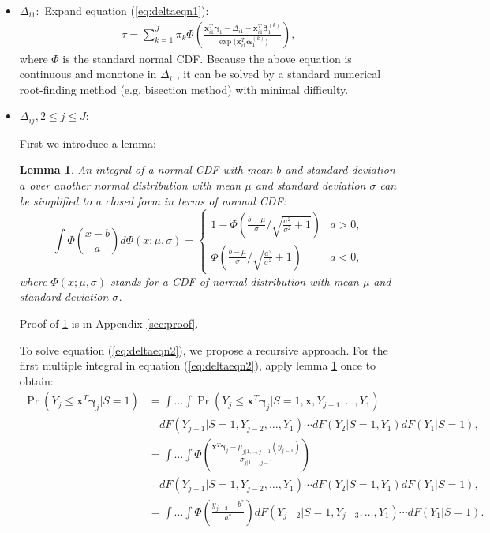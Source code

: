 \documentclass[12pt]{article}
\newtheorem{lem}[thm]{Lemma}
\DeclareMathOperator{\prob}{Pr}
\begin{document}
\begin{itemize}
\item \textbf{$\Delta_{i1}: $} Expand equation (\ref{eq:deltaeqn1}):
  \begin{align*}
    \tau = \sum_{k = 1}^J \pi_k \Phi \left( \frac{\bm x_{i1}^T \bm
        \gamma_1 - \Delta_{i1} - \bm x_{i1}^T\bm \beta_1^{(k)}}{\exp
        \big( \bm x_{i1}^T \bm \alpha_1^{(k)} \big)} \right),
  \end{align*}
  where $\Phi$ is the standard normal CDF. Because the above equation
  is continuous and monotone in $\Delta_{i1}$, it can be solved by a
  standard numerical root-finding method (e.g. bisection method) with
  minimal difficulty.

\item \textbf{$\Delta_{ij}, 2\leq j \leq J: $}

  First we introduce a lemma:
  \begin{lem}\label{sec:lemma}
    An integral of a normal CDF with mean $b$ and standard deviation
    $a$ over another normal distribution with mean $\mu$ and standard
    deviation $\sigma$ can be simplified to a closed form in terms of
    normal CDF:
    \begin{equation}
      \label{eq:lem}
      \int \Phi \left( \frac{x-b}{a} \right) d\Phi(x; \mu, \sigma)  =
      \begin{cases}
        1- \Phi \left( \frac{b-\mu}{\sigma} \big / \sqrt{\frac{a^2}{\sigma^2}+1} \right) & a > 0, \\
        \Phi \left( \frac{b-\mu}{\sigma} \big /
          \sqrt{\frac{a^2}{\sigma^2}+1} \right) & a < 0,
      \end{cases}
    \end{equation}
    where $\Phi(x; \mu, \sigma)$ stands for a CDF of normal
    distribution with mean $\mu$ and standard deviation $\sigma$.
  \end{lem}
  Proof of \ref{sec:lemma} is in Appendix \ref{sec:proof}.

  To solve equation (\ref{eq:deltaeqn2}), we propose a recursive
  approach. For the first multiple integral in equation
  (\ref{eq:deltaeqn2}), apply lemma \ref{sec:lemma} once to obtain:
  \begin{align*}
    \prob (Y_j \leq \bm x^T \bm \gamma_j | S = 1) & = \int\dots\int
    \prob (Y_j \leq \bm x^T\bm \gamma_j | S=1, \bm x, Y_{j-1}, \ldots, Y_1)\\
    & \quad  dF(Y_{j-1}|S=1, Y_{j-2}, \ldots, Y_1) \cdots dF(Y_2|S=1, Y_1) d F (Y_1 | S = 1), \\
    & = \int\dots\int
    \Phi \left( \frac{\bm x^T \bm \gamma_j - \mu_{j|1, \ldots, j-1}(y_{j-1})}{\sigma_{j|1, \ldots, j-1}} \right) \\
    & \quad dF(Y_{j-1}|S=1, Y_{j-2}, \ldots, Y_1) \cdots dF(Y_2|S=1, Y_1) d F (Y_1 | S = 1), \\
    & = \int\dots\int \Phi \left( \frac{y_{j-2} - b^{*}}{a^{*}}
    \right) dF(Y_{j-2}|S=1, Y_{j-3}, \ldots, Y_1) \cdots d F (Y_1 | S
    = 1).
  \end{align*}


\end{itemize}
\end{document}
